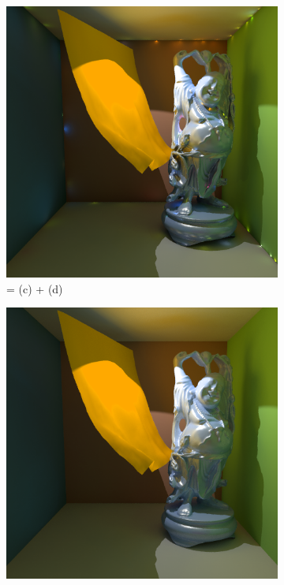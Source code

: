 \begin{figure}
\begin{fullwidth}
	\begin{subfigure}[b]{0.195\thewidth}
		\includegraphics[width=1.0\textwidth]{figures/ir/ir-7-1}
		\caption{= (c) + (d)}
	\end{subfigure}
	\begin{subfigure}[b]{0.195\thewidth}
		\includegraphics[width=1.0\textwidth]{figures/ir/ir-7-4}

\end{subfigure}
\end{fullwidth}
\end{figure}
